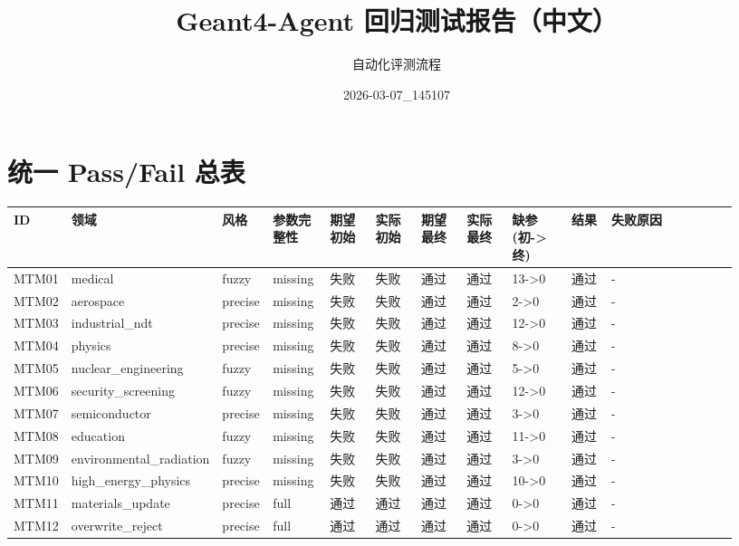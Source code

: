\documentclass[11pt]{ctexart}
\title{Geant4-Agent 回归测试报告（中文）}
\author{自动化评测流程}
\date{2026-03-07\_145107}
\begin{document}
\maketitle
\section{统一 Pass/Fail 总表}
\begin{longtable}{p{0.06\linewidth}p{0.08\linewidth}p{0.07\linewidth}p{0.08\linewidth}p{0.07\linewidth}p{0.07\linewidth}p{0.07\linewidth}p{0.07\linewidth}p{0.09\linewidth}p{0.06\linewidth}p{0.21\linewidth}}
\toprule
ID & 领域 & 风格 & 参数完整性 & 期望初始 & 实际初始 & 期望最终 & 实际最终 & 缺参(初->终) & 结果 & 失败原因 \\
\midrule
MTM01 & medical & fuzzy & missing & 失败 & 失败 & 通过 & 通过 & 13->0 & 通过 & - \\
MTM02 & aerospace & precise & missing & 失败 & 失败 & 通过 & 通过 & 2->0 & 通过 & - \\
MTM03 & industrial\_ndt & precise & missing & 失败 & 失败 & 通过 & 通过 & 12->0 & 通过 & - \\
MTM04 & physics & precise & missing & 失败 & 失败 & 通过 & 通过 & 8->0 & 通过 & - \\
MTM05 & nuclear\_engineering & fuzzy & missing & 失败 & 失败 & 通过 & 通过 & 5->0 & 通过 & - \\
MTM06 & security\_screening & fuzzy & missing & 失败 & 失败 & 通过 & 通过 & 12->0 & 通过 & - \\
MTM07 & semiconductor & precise & missing & 失败 & 失败 & 通过 & 通过 & 3->0 & 通过 & - \\
MTM08 & education & fuzzy & missing & 失败 & 失败 & 通过 & 通过 & 11->0 & 通过 & - \\
MTM09 & environmental\_radiation & fuzzy & missing & 失败 & 失败 & 通过 & 通过 & 3->0 & 通过 & - \\
MTM10 & high\_energy\_physics & precise & missing & 失败 & 失败 & 通过 & 通过 & 10->0 & 通过 & - \\
MTM11 & materials\_update & precise & full & 通过 & 通过 & 通过 & 通过 & 0->0 & 通过 & - \\
MTM12 & overwrite\_reject & precise & full & 通过 & 通过 & 通过 & 通过 & 0->0 & 通过 & - \\
\bottomrule
\end{longtable}
\end{document}
